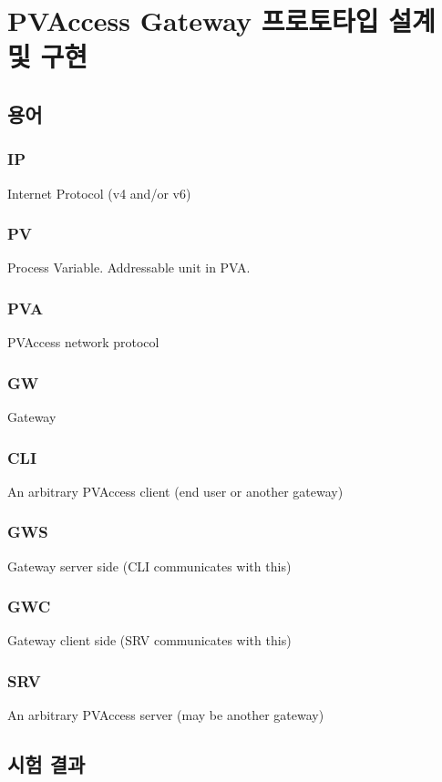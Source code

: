 \documentclass[11pt
  , a4paper
  , article
  , oneside
]{memoir}
\begin{document}
\clearpage


\section{PVAccess Gateway 프로토타입 설계 및 구현}
\subsection{용어}

\subsubsection{IP}
Internet Protocol (v4 and/or v6)

\subsubsection{PV}
Process Variable. Addressable unit in PVA.

\subsubsection{PVA}
PVAccess network protocol

\subsubsection{GW}
Gateway

\subsubsection{CLI}
An arbitrary PVAccess client (end user or another gateway)

\subsubsection{GWS}
Gateway server side (CLI communicates with this)

\subsubsection{GWC}
Gateway client side (SRV communicates with this)

\subsubsection{SRV}
An arbitrary PVAccess server (may be another gateway)



\subsection{시험 결과}



















\clearpage


\end{document}
